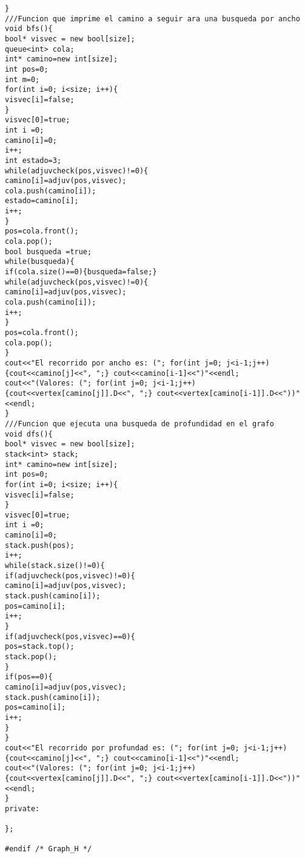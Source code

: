 \documentclass[11pt]{article}
\begin{document}
\begin{lstlisting}
}
///Funcion que imprime el camino a seguir ara una busqueda por ancho
void bfs(){
bool* visvec = new bool[size];
queue<int> cola;
int* camino=new int[size];
int pos=0;
int m=0;
for(int i=0; i<size; i++){
visvec[i]=false;
}
visvec[0]=true;
int i =0;
camino[i]=0;
i++;
int estado=3;
while(adjuvcheck(pos,visvec)!=0){
camino[i]=adjuv(pos,visvec);
cola.push(camino[i]);
estado=camino[i];
i++;
}
pos=cola.front();
cola.pop();
bool busqueda =true;
while(busqueda){
if(cola.size()==0){busqueda=false;}
while(adjuvcheck(pos,visvec)!=0){
camino[i]=adjuv(pos,visvec);
cola.push(camino[i]);
i++;
}
pos=cola.front();
cola.pop();
}
cout<<"El recorrido por ancho es: ("; for(int j=0; j<i-1;j++){cout<<camino[j]<<", ";} cout<<camino[i-1]<<")"<<endl;
cout<<"(Valores: ("; for(int j=0; j<i-1;j++){cout<<vertex[camino[j]].D<<", ";} cout<<vertex[camino[i-1]].D<<"))"<<endl;
}
///Funcion que ejecuta una busqueda de profundidad en el grafo
void dfs(){
bool* visvec = new bool[size];
stack<int> stack;
int* camino=new int[size];
int pos=0;
for(int i=0; i<size; i++){
visvec[i]=false;
}
visvec[0]=true;
int i =0;
camino[i]=0;
stack.push(pos);
i++;
while(stack.size()!=0){
if(adjuvcheck(pos,visvec)!=0){
camino[i]=adjuv(pos,visvec);
stack.push(camino[i]);
pos=camino[i];
i++;
}
if(adjuvcheck(pos,visvec)==0){
pos=stack.top();
stack.pop();
}
if(pos==0){
camino[i]=adjuv(pos,visvec);
stack.push(camino[i]);
pos=camino[i];
i++;
}
}
cout<<"El recorrido por profundad es: ("; for(int j=0; j<i-1;j++){cout<<camino[j]<<", ";} cout<<camino[i-1]<<")"<<endl;
cout<<"(Valores: ("; for(int j=0; j<i-1;j++){cout<<vertex[camino[j]].D<<", ";} cout<<vertex[camino[i-1]].D<<"))"<<endl;
}
private:

};

#endif /* Graph_H */

\end{lstlisting}
\end{document}
